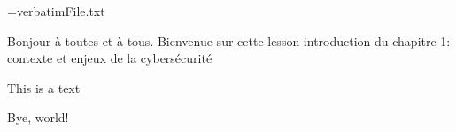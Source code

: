 \documentclass{article}
\begin{document}
\newwrite\verbatimFile
\immediate\openout\verbatimFile=verbatimFile.txt\relax%

\begin{verbatimappend}
Bonjour à toutes et à tous. Bienvenue sur cette lesson introduction du chapitre 1: contexte et enjeux de la cybersécurité
\end{verbatimappend}

This is a text

\begin{verbatimappend}
Bye, world!
\end{verbatimappend}

\immediate\closeout\verbatimFile
\end{document}
